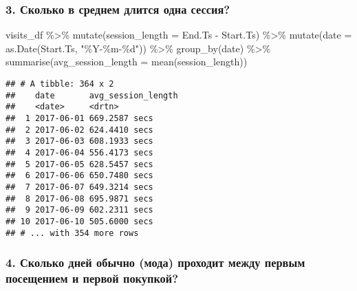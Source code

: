 \documentclass[
]{article}
\newenvironment{Shaded}{\begin{snugshade}}{\end{snugshade}}
\newcommand{\AttributeTok}[1]{\textcolor[rgb]{0.77,0.63,0.00}{#1}}
\newcommand{\FunctionTok}[1]{\textcolor[rgb]{0.00,0.00,0.00}{#1}}
\newcommand{\NormalTok}[1]{#1}
\newcommand{\SpecialCharTok}[1]{\textcolor[rgb]{0.00,0.00,0.00}{#1}}
\newcommand{\StringTok}[1]{\textcolor[rgb]{0.31,0.60,0.02}{#1}}
\begin{document}
\hypertarget{ux441ux43aux43eux43bux44cux43aux43e-ux432-ux441ux440ux435ux434ux43dux435ux43c-ux434ux43bux438ux442ux441ux44f-ux43eux434ux43dux430-ux441ux435ux441ux441ux438ux44f}{%
\subsubsection{3. Сколько в среднем длится одна
сессия?}\label{ux441ux43aux43eux43bux44cux43aux43e-ux432-ux441ux440ux435ux434ux43dux435ux43c-ux434ux43bux438ux442ux441ux44f-ux43eux434ux43dux430-ux441ux435ux441ux441ux438ux44f}}

\begin{Shaded}
\begin{Highlighting}[]
\NormalTok{visits\_df }\SpecialCharTok{\%\textgreater{}\%} 
  \FunctionTok{mutate}\NormalTok{(}\AttributeTok{session\_length =}\NormalTok{ End.Ts }\SpecialCharTok{{-}}\NormalTok{ Start.Ts) }\SpecialCharTok{\%\textgreater{}\%} 
  \FunctionTok{mutate}\NormalTok{(}\AttributeTok{date =} \FunctionTok{as.Date}\NormalTok{(Start.Ts, }\StringTok{"\%Y{-}\%m{-}\%d"}\NormalTok{)) }\SpecialCharTok{\%\textgreater{}\%} 
  \FunctionTok{group\_by}\NormalTok{(date) }\SpecialCharTok{\%\textgreater{}\%} 
  \FunctionTok{summarise}\NormalTok{(}\AttributeTok{avg\_session\_length =} \FunctionTok{mean}\NormalTok{(session\_length))}
\end{Highlighting}
\end{Shaded}

\begin{verbatim}
## # A tibble: 364 x 2
##    date       avg_session_length
##    <date>     <drtn>            
##  1 2017-06-01 669.2587 secs     
##  2 2017-06-02 624.4410 secs     
##  3 2017-06-03 608.1933 secs     
##  4 2017-06-04 556.4173 secs     
##  5 2017-06-05 628.5457 secs     
##  6 2017-06-06 650.7480 secs     
##  7 2017-06-07 649.3214 secs     
##  8 2017-06-08 695.9871 secs     
##  9 2017-06-09 602.2311 secs     
## 10 2017-06-10 505.6000 secs     
## # ... with 354 more rows
\end{verbatim}

\hypertarget{ux441ux43aux43eux43bux44cux43aux43e-ux434ux43dux435ux439-ux43eux431ux44bux447ux43dux43e-ux43cux43eux434ux430-ux43fux440ux43eux445ux43eux434ux438ux442-ux43cux435ux436ux434ux443-ux43fux435ux440ux432ux44bux43c-ux43fux43eux441ux435ux449ux435ux43dux438ux435ux43c-ux438-ux43fux435ux440ux432ux43eux439-ux43fux43eux43aux443ux43fux43aux43eux439}{%
\subsubsection{4. Сколько дней обычно (мода) проходит между первым
посещением и первой
покупкой?}\label{ux441ux43aux43eux43bux44cux43aux43e-ux434ux43dux435ux439-ux43eux431ux44bux447ux43dux43e-ux43cux43eux434ux430-ux43fux440ux43eux445ux43eux434ux438ux442-ux43cux435ux436ux434ux443-ux43fux435ux440ux432ux44bux43c-ux43fux43eux441ux435ux449ux435ux43dux438ux435ux43c-ux438-ux43fux435ux440ux432ux43eux439-ux43fux43eux43aux443ux43fux43aux43eux439}}
\end{document}
